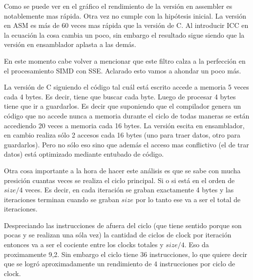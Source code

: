 	Como se puede ver en el gráfico el rendimiento de la versión en assembler es notablemente mas rápida. Otra
vez no cumple con la hipótesis inicial. La versión en ASM es más de 60 veces mas rápida que la versión
de C. Al introducir ICC en la ecuación la cosa cambia un poco, sin embargo el resultado sigue siendo que
la versión en ensamblador aplasta a las demás.

	En este momento cabe volver a mencionar que este filtro calza a la perfección en el procesamiento
SIMD con SSE. Aclarado esto vamos a ahondar un poco más.

	La versión de C siguiendo el código tal cuál está escrito accede a memoria 5 veces cada 4 bytes.
Es decir, tiene que buscar cada byte. Luego de procesar 4 bytes tiene que ir a guardarlos. Es decir
que suponiendo que el compilador genera un código que no accede nunca a memoria durante el ciclo de todas
maneras se están accediendo 20 veces a memoria cada 16 bytes. La versión escita en ensamblador, en cambio
realiza sólo 2 accesos cada 16 bytes (uno para traer datos, otro para guardarlos). Pero no sólo eso sino
que además el acceso mas conflictivo (el de trar datos) está optimizado mediante entubado de código.

	Otra cosa importante a la hora de hacer este análisis es que se sabe con mucha presición
cuantas veces se realiza el ciclo principal. Si o si está en el orden de $size/4$ veces. Es decir,
en cada iteración se graban exactamente 4 bytes y las iteraciones terminan cuando se graban $size$
por lo tanto ese va a ser el total de iteraciones.

	Despreciando las instrucciones de afuera del ciclo (que tiene sentido porque son pocas y se
realizan una sóla vez) la cantidad de ciclos de clock por iteración entonces va a ser el cociente
entre los clocks totales y $size/4$. Eso da proximamente 9,2. Sin embargo el ciclo tiene 36
instrucciones, lo que quiere decir que se logró aproximadamente un rendimiento de 4 instrucciones
por ciclo de clock.

	
